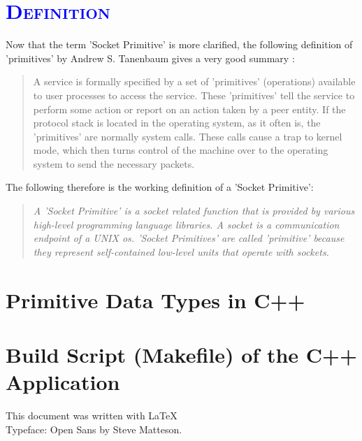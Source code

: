 \documentclass[xcolor=dvipsnames]{article}
\begin{document}
\section{\scshape{\textcolor{blue}{Definition}}} \label{definition}

Now that the term 'Socket Primitive' is more clarified, the following definition of 'primitives' by Andrew S. Tanenbaum gives a very good summary \cite[p. 38, ch. 1.3.4]{computer_networks}:

\begin{quote}
A service is formally specified by a set of 'primitives' (operations) available to user processes to access the service. These 'primitives' tell the service to perform some action or report on an action taken by a peer entity. If the protocol stack is located in the operating system, as it often is, the 'primitives' are normally system calls. These calls cause a trap to kernel mode, which then turns control of the machine over to the operating system to send the necessary packets.
\end{quote}

\noindent The following therefore is the working definition of a 'Socket Primitive':

\begin{quote}

\textit{A 'Socket Primitive' is a socket related function that is provided by various high-level programming language libraries. A socket is a communication endpoint of a UNIX \gls{os}. 'Socket Primitives' are called 'primitive' because they represent self-contained low-level units that operate with sockets.}

\end{quote}

\newpage

\begin{appendix}

\section{Primitive Data Types in C++}\label{c++_data_types}



\newpage

\section{Build Script (Makefile) of the C++ Application}\label{makefile}



\end{appendix}

\newpage

\printnoidxglossaries




\vfill
\begin{center}
This document was written with \LaTeX 
\\Typeface: Open Sans by Steve Matteson.
\end{center}

\end{document}
